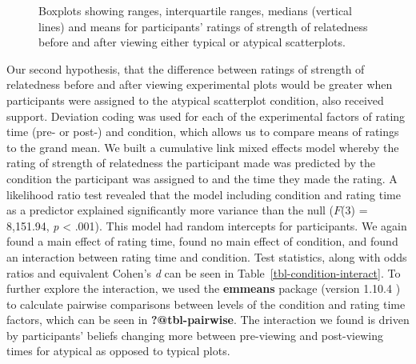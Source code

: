 \documentclass[manuscript,screen,review,anonymous]{acmart}
\begin{document}
\begin{figure}


\caption{\label{fig-descriptives}Boxplots showing ranges, interquartile
ranges, medians (vertical lines) and means for participants' ratings of
strength of relatedness before and after viewing either typical or
atypical scatterplots.}

\end{figure}%

Our second hypothesis, that the difference between ratings of strength
of relatedness before and after viewing experimental plots would be
greater when participants were assigned to the atypical scatterplot
condition, also received support. Deviation coding was used for each of
the experimental factors of rating time (pre- or post-) and condition,
which allows us to compare means of ratings to the grand mean. We built
a cumulative link mixed effects model whereby the rating of strength of
relatedness the participant made was predicted by the condition the
participant was assigned to and the time they made the rating. A
likelihood ratio test revealed that the model including condition and
rating time as a predictor explained significantly more variance than
the null (\(F\)(3) = 8,151.94, \emph{p} \textless{} .001). This model
had random intercepts for participants. We again found a main effect of
rating time, found no main effect of condition, and found an interaction
between rating time and condition. Test statistics, along with odds
ratios and equivalent Cohen's \emph{d} can be seen in
Table~\ref{tbl-condition-interact}. To further explore the interaction,
we used the \textbf{emmeans} package (version 1.10.4 \citep{emmeans}) to
calculate pairwise comparisons between levels of the condition and
rating time factors, which can be seen in \textbf{?@tbl-pairwise}. The
interaction we found is driven by participants' beliefs changing more
between pre-viewing and post-viewing times for atypical as opposed to
typical plots.
\end{document}
